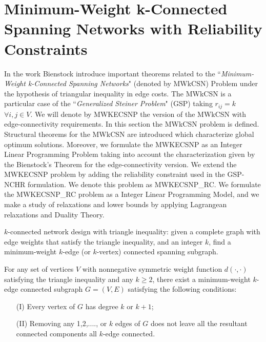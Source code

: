 \section{Minimum-Weight k-Connected Spanning Networks with Reliability Constraints}
In the work \cite{116} Bienstock
introduce important theorems related to the ``\textit{Minimum-Weight k-Connected Spanning Networks}" (denoted
by MWkCSN) Problem under the hypothesis of triangular inequality
in edge costs. The MWkCSN is a particular case of the
``\textit{Generalized Steiner Problem}" (GSP) taking $r_{ij}=k$
$\forall i,j\in V$. We will denote by MWKECSNP the version of the
MWkCSN with edge-connectivity requirements. In this section the
MWkCSN problem is defined. Structural theorems for the MWkCSN are
introduced which characterize global optimum solutions. Moreover,
we formulate the MWKECSNP as an Integer Linear Programming Problem
taking into account the characterization given by the Bienstock's
Theorem for the edge-connectivity version. We extend the MWKECSNP
problem by adding the reliability constraint used in the GSP-NCHR
formulation. We denote this problem as MWKECSNP\_RC. We formulate
the MWKECSNP\_RC problem as a Integer Linear Programming Model,
and we make a study of relaxations and lower bounds by applying
Lagrangean relaxations and Duality Theory.\\


\begin{definition}[MWkCSN]
$k$-connected network design with triangle inequality: given a
complete graph with edge weights that satisfy the triangle
inequality, and an integer $k$, find a minimum-weight $k$-edge (or
$k$-vertex) connected spanning subgraph.
\end{definition}


\begin{theorem}[\cite{116}] %
For any set of vertices $V$ with nonnegative symmetric weight
function $d(\cdot,\cdot)$ satisfying the triangle inequality and
any $k\geq 2$, there exist a minimum-weight $k$-edge connected
subgraph $G=(V,E)$ satisfying the following conditions:
\begin{enumerate}
    \item[(I)] Every vertex of $G$ has degree $k$ or $k+1$;
    \item[(II)] Removing any 1,2,...., or $k$ edges of $G$ does not
    leave all the resultant connected components all $k$-edge
    connected.
\end{enumerate}
\end{theorem}

